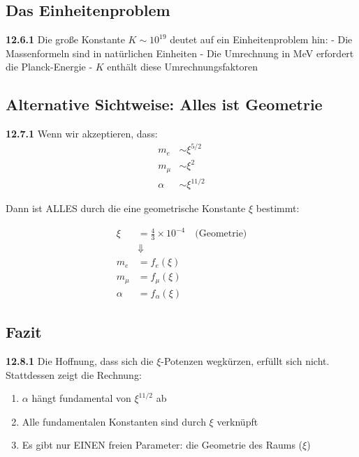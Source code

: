 \subsection{Das Einheitenproblem}

\noindent \textbf{12.6.1} Die große Konstante $K \sim 10^{19}$ deutet auf ein Einheitenproblem hin:
- Die Massenformeln sind in natürlichen Einheiten
- Die Umrechnung in MeV erfordert die Planck-Energie
- $K$ enthält diese Umrechnungsfaktoren

\subsection{Alternative Sichtweise: Alles ist Geometrie}

\noindent \textbf{12.7.1} Wenn wir akzeptieren, dass:
\begin{align}
	m_e &\sim \xi^{5/2} \\
	m_\mu &\sim \xi^2 \\
	\alpha &\sim \xi^{11/2}
\end{align}

Dann ist ALLES durch die eine geometrische Konstante $\xi$ bestimmt:

\begin{equation}
	\boxed{
		\begin{aligned}
			\xi &= \frac{4}{3} \times 10^{-4} \quad \text{(Geometrie)} \\
			&\Downarrow \\
			m_e &= f_e(\xi) \\
			m_\mu &= f_\mu(\xi) \\
			\alpha &= f_\alpha(\xi)
		\end{aligned}
	}
\end{equation}

\subsection{Fazit}

\noindent \textbf{12.8.1} Die Hoffnung, dass sich die $\xi$-Potenzen wegkürzen, erfüllt sich nicht. Stattdessen zeigt die Rechnung:

\begin{enumerate}
	\item $\alpha$ hängt fundamental von $\xi^{11/2}$ ab
	\item Alle fundamentalen Konstanten sind durch $\xi$ verknüpft
	\item Es gibt nur EINEN freien Parameter: die Geometrie des Raums ($\xi$)
\end{enumerate}

